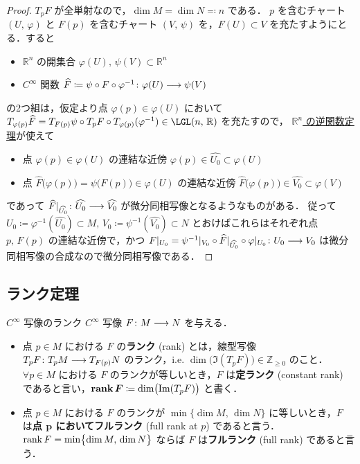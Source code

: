 \documentclass[TQFT_main]{subfiles}
\begin{document}
\begin{proof}
    $T_p F$ が全単射なので，$\dim M = \dim N \eqqcolon n$ である．
    $p$ を含むチャート $(U,\, \varphi)$ と $F(p)$ を含むチャート $(V,\, \psi)$ を，$F(U) \subset V$ を充たすようにとる．すると
    \begin{itemize}
        \item $\mathbb{R}^n$ の開集合 $\varphi(U),\, \psi(V) \subset \mathbb{R}^n$
        \item $C^\infty$ 関数 $\widehat{F} \coloneqq \psi \circ F \circ \varphi^{-1} \colon \varphi(U) \longrightarrow \psi(V)$
    \end{itemize}
    の2つ組は，仮定より点 $\varphi(p) \in \varphi(U)$ において $T_{\varphi(p)} \widehat{F} = T_{F(p)} \psi \circ T_{p} F \circ T_{\varphi(p)} (\varphi^{-1}) \in \LGL(n,\, \mathbb{R})$ を充たすので，
    \hyperref[thm:inverse-function-Rn]{$\mathbb{R}^n$ の逆関数定理}が使えて
    \begin{itemize}
        \item 点 $\varphi(p) \in \varphi(U)$ の連結な近傍 $\varphi(p) \in \widehat{U_0} \subset \varphi(U)$
        \item 点 $\widehat{F}\bigl(\varphi(p)\bigr) = \psi \bigl( F(p) \bigr) \in \varphi(U)$ の連結な近傍 $\widehat{F}\bigl(\varphi(p)\bigr) \in \widehat{V_0} \subset \varphi(V)$
    \end{itemize}
    であって $\widehat{F}|_{\widehat{U_0}} \colon \widehat{U_0} \longrightarrow \widehat{V_0}$ が微分同相写像となるようなものがある．
    従って $U_0 \coloneqq \varphi^{-1} (\widehat{U_0}) \subset M,\, V_0 \coloneqq \psi^{-1}(\widehat{V_0}) \subset N$ とおけばこれらはそれぞれ点 $p,\, F(p)$ の連結な近傍で，かつ $F|_{U_0} = \psi^{-1}|_{V_0} \circ \widehat{F}|_{\widehat{U_0}} \circ \varphi|_{U_0} \colon U_0 \longrightarrow V_0$ は微分同相写像の合成なので微分同相写像である．
\end{proof}



\subsection{ランク定理}

\begin{mydef}[label=def:rank-smooth]{$C^\infty$ 写像のランク}
    $C^\infty$ 写像 $F \colon M \longrightarrow N$ を与える．
    \begin{itemize}
        \item 点 $p \in M$ における $F$ の\textbf{ランク} (rank) とは，線型写像 $T_p F \colon T_p M \longrightarrow T_{F(p)} N$ のランク，i.e. $\dim \bigl(\Im (T_p F)\bigr) \in \mathbb{Z}_{\ge 0}$ のこと．$\forall p \in M$ における $F$ のランクが等しいとき，$F$ は\textbf{定ランク} (constant rank) であると言い，$\bm{\rank F} \coloneqq \dim \bigl(\Im (T_p F)\bigr)$ と書く．
        \item 点 $p \in M$ における $F$ のランクが $\min \bigl\{\dim M,\, \dim N\bigr\}$ に等しいとき，$F$ は\textbf{点 $\bm{p}$ においてフルランク} (full rank at $p$) であると言う．
        $\rank F = \min \bigl\{\dim M,\, \dim N\bigr\}$ ならば $F$ は\textbf{フルランク} (full rank) であると言う．
    \end{itemize}
\end{mydef}
\end{document}
